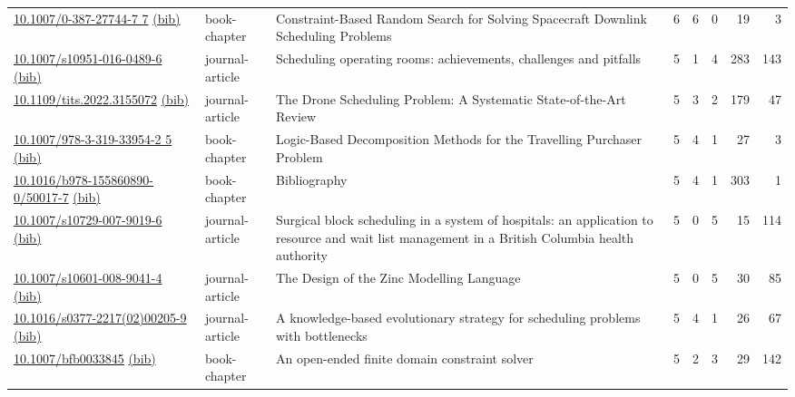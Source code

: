{\begin{longtable}{p{5cm}lp{11cm}rrrrr}
\href{http://dx.doi.org/10.1007/0-387-27744-7_7}{10.1007/0-387-27744-7 7} \href{https://www.doi2bib.org/bib/10.1007/0-387-27744-7_7}{(bib)} & book-chapter & Constraint-Based Random Search for Solving Spacecraft Downlink Scheduling Problems & 6 & 6 & 0 & 19 & 3 \\
\href{http://dx.doi.org/10.1007/s10951-016-0489-6}{10.1007/s10951-016-0489-6} \href{https://www.doi2bib.org/bib/10.1007/s10951-016-0489-6}{(bib)} & journal-article & Scheduling operating rooms: achievements, challenges and pitfalls & 5 & 1 & 4 & 283 & 143 \\
\href{http://dx.doi.org/10.1109/tits.2022.3155072}{10.1109/tits.2022.3155072} \href{https://www.doi2bib.org/bib/10.1109/tits.2022.3155072}{(bib)} & journal-article & The Drone Scheduling Problem: A Systematic State-of-the-Art Review & 5 & 3 & 2 & 179 & 47 \\
\href{http://dx.doi.org/10.1007/978-3-319-33954-2_5}{10.1007/978-3-319-33954-2 5} \href{https://www.doi2bib.org/bib/10.1007/978-3-319-33954-2_5}{(bib)} & book-chapter & Logic-Based Decomposition Methods for the Travelling Purchaser Problem & 5 & 4 & 1 & 27 & 3 \\
\href{http://dx.doi.org/10.1016/b978-155860890-0/50017-7}{10.1016/b978-155860890-0/50017-7} \href{https://www.doi2bib.org/bib/10.1016/b978-155860890-0/50017-7}{(bib)} & book-chapter & Bibliography & 5 & 4 & 1 & 303 & 1 \\
\href{http://dx.doi.org/10.1007/s10729-007-9019-6}{10.1007/s10729-007-9019-6} \href{https://www.doi2bib.org/bib/10.1007/s10729-007-9019-6}{(bib)} & journal-article & Surgical block scheduling in a system of hospitals: an application to resource and wait list management in a British Columbia health authority & 5 & 0 & 5 & 15 & 114 \\
\href{http://dx.doi.org/10.1007/s10601-008-9041-4}{10.1007/s10601-008-9041-4} \href{https://www.doi2bib.org/bib/10.1007/s10601-008-9041-4}{(bib)} & journal-article & The Design of the Zinc Modelling Language & 5 & 0 & 5 & 30 & 85 \\
\href{http://dx.doi.org/10.1016/s0377-2217(02)00205-9}{10.1016/s0377-2217(02)00205-9} \href{https://www.doi2bib.org/bib/10.1016/s0377-2217(02)00205-9}{(bib)} & journal-article & A knowledge-based evolutionary strategy for scheduling problems with bottlenecks & 5 & 4 & 1 & 26 & 67 \\
\href{http://dx.doi.org/10.1007/bfb0033845}{10.1007/bfb0033845} \href{https://www.doi2bib.org/bib/10.1007/bfb0033845}{(bib)} & book-chapter & An open-ended finite domain constraint solver & 5 & 2 & 3 & 29 & 142 \\

\end{longtable}}
